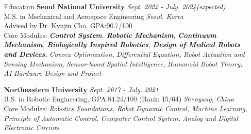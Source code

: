 \begin{rSection}{Education}
{\bf Seoul National University} \hfill {\em Sept. 2022 - July. 2024(expected)} \\
{M.S. in Mechanical and Aerospace Engineering} \hfill {\em Seoul, Korea}\\
Advised by Dr. Kyujin Cho, {GPA:90.7/100}\\
{Core Modules: \emph{\textbf{Control System}, \textbf{Robotic Mechanism}, \textbf{Continuum Mechanism}, \textbf{Biologically Inspired Robotics}, \textbf{Design of Medical Robots and Devices}, Convex Optimization, Differential Equation, Robot Actuation and Sensing Mechanism, Sensor-based Spatial Intelligence, Humanoid Robot Theory, AI Hardware Design and Project} }

{\bf Northeastern University} \hfill {\em Sept. 2017 - July. 2021} \\
{B.S. in Robotic Engineering}, {GPA:84.24/100 (Rank: 15/64)} \hfill {\em Shenyang, China}\\
{Core Modules: \emph{Robotics Foundations, Robot Dynamic Control, Machine Learning, Principle of Automatic Control, Computer Control System, Analog and Digital Electronic Circuits} }
\end{rSection}

